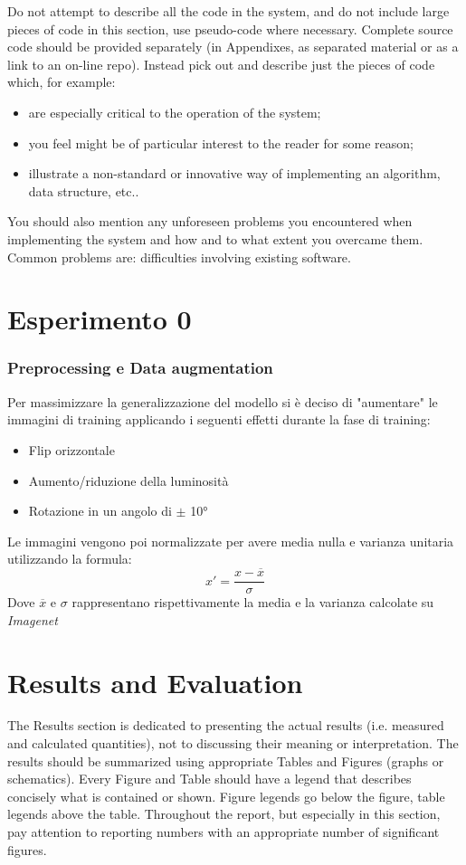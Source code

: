 Do not attempt to describe all the code in the system, and do not include large pieces of code in this section, use pseudo-code where necessary. Complete source code should be provided separately (in Appendixes, as separated material or as a link to an on-line repo). Instead pick out and describe just the pieces of code which, for example:
\begin{itemize}
\item are especially critical to the operation of the system;
\item you feel might be of particular interest to the reader for some reason;
\item  illustrate a non-standard or innovative way of implementing an algorithm, data
structure, etc..
\end{itemize}

You should also mention any unforeseen problems you encountered when implementing the
system and how and to what extent you overcame them. Common problems are:
 difficulties involving existing software.

\section{Esperimento 0}
\subsubsection{Preprocessing e Data augmentation}
Per massimizzare la generalizzazione del modello si è deciso di "aumentare" le immagini di training applicando i seguenti effetti durante la fase di training:
\begin{itemize}
\item Flip orizzontale
\item Aumento/riduzione della luminosità 
\item Rotazione in un angolo di $\pm$ 10°
\end{itemize}
Le immagini vengono poi normalizzate per avere media nulla e varianza unitaria utilizzando la formula:
\begin{equation}
x' = \frac{x - \overline{x}}{\sigma}
\end{equation}
Dove $ \overline{x} $ e $ \sigma $ rappresentano rispettivamente la media e la varianza calcolate su \textit{Imagenet}
\section{Results and Evaluation}
The Results section is dedicated to presenting the actual results (i.e. measured and calculated quantities), not to discussing their meaning or interpretation. The results should be summarized using appropriate Tables and Figures (graphs or schematics). Every Figure and Table should have a legend that describes concisely what is contained or shown. Figure legends go below the figure, table legends above the table. Throughout the report, but especially in this section, pay attention to reporting numbers with an appropriate number of significant figures. 

